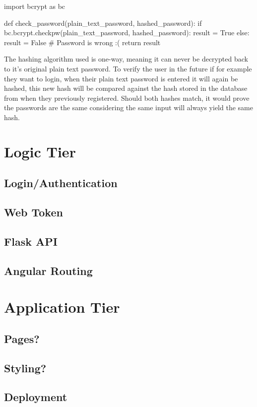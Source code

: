 \begin{python}[caption=Verifing a Password]
import bcrypt as bc

def check_password(plain_text_password, hashed_password):
    if bc.bcrypt.checkpw(plain_text_password, hashed_password):
        result = True
    else:
        result = False # Password is wrong :(
    return result
\end{python}

The hashing algorithm used is one-way, meaning it can never be decrypted back to it's original plain text password. To verify the user in the future if for example they want to login, when their plain text password is entered it will again be hashed, this new hash will be compared against the hash stored in the database from when they previously registered. Should both hashes match, it would prove the passwords are the same considering the same input will always yield the same hash.

\section{Logic Tier}
\subsection{Login/Authentication}
\subsection{Web Token}
\subsection{Flask API}
\subsection{Angular Routing}

\section{Application Tier}
\subsection{Pages?}
\subsection{Styling?}
\subsection{Deployment}
